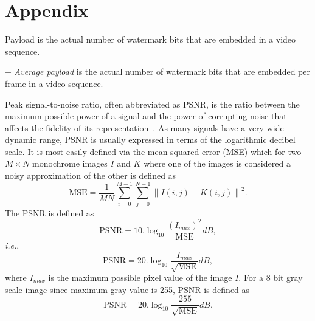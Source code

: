 \chapter*{Appendix}
\label{appendix}



\noindent Payload is the actual number of watermark bits that are embedded in a video sequence. 

\noindent$-$ \textit{Average payload} is the actual number of watermark bits that are embedded per frame in a video sequence. \\

%



\noindent Peak signal-to-noise ratio, often abbreviated as PSNR, is the ratio between the maximum possible power of a signal and the power of corrupting noise that affects the fidelity of its representation~\cite{psnr}. As many signals have a very wide dynamic range, PSNR is usually expressed in terms of the logarithmic decibel scale.
It is most easily defined via the mean squared error (MSE) which for two $M \times N$ monochrome images $I$ and $K$ where one of the images is considered a noisy approximation of the other is defined as
\begin{equation}
\text{MSE} = \frac{1}{MN}\sum_{i=0}^{M-1}\sum_{j=0}^{N-1}\left\|I(i,j) - K(i,j)\right\|^2.\nonumber
\end{equation}
The PSNR is defined as
\begin{equation}
\text{PSNR} = 10. \log_{10}\frac{(I_{max})^2}{\text{MSE}} dB,\nonumber
\end{equation}
\textit{i.e.},
\begin{equation}
\text{PSNR} = 20. \log_{10}\frac{I_{max}}{\sqrt{\text{MSE}}} dB,\nonumber
\end{equation}
where $I_{max}$ is the maximum possible pixel value of the image $I$. 
For a 8 bit gray scale image since maximum gray value is 255, PSNR is defined as
\begin{equation}
\text{PSNR} = 20. \log_{10}\frac{255}{\sqrt{\text{MSE}}} dB.\nonumber
\end{equation}

